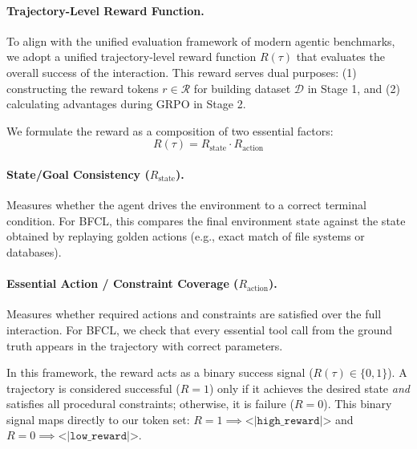 \documentclass{article}
\theoremstyle{plain}
\theoremstyle{definition}
\theoremstyle{remark}
\begin{document}
\paragraph{Trajectory-Level Reward Function.}
\label{sec:reward_function}
To align with the unified evaluation framework of modern agentic benchmarks, we adopt a unified trajectory-level reward function $R(\tau)$ that evaluates the overall success of the interaction. This reward serves dual purposes: (1) constructing the reward tokens $r \in \mathcal{R}$ for building dataset $\mathcal{D}$ in Stage 1, and (2) calculating advantages during GRPO in Stage 2.

We formulate the reward as a composition of two essential factors:
\begin{equation}
\label{eq:norm_reward}
    R(\tau) = R_{\text{state}} \cdot R_{\text{action}}
\end{equation}

\paragraph{State/Goal Consistency ($R_{\text{state}}$).}
Measures whether the agent drives the environment to a correct terminal condition. For BFCL, this compares the final environment state against the state obtained by replaying golden actions (e.g., exact match of file systems or databases).

\paragraph{Essential Action / Constraint Coverage ($R_{\text{action}}$).}
Measures whether required actions and constraints are satisfied over the full interaction. For BFCL, we check that every essential tool call from the ground truth appears in the trajectory with correct parameters.

In this framework, the reward acts as a binary success signal ($R(\tau) \in \{0, 1\}$). A trajectory is considered successful ($R=1$) only if it achieves the desired state \emph{and} satisfies all procedural constraints; otherwise, it is failure ($R=0$). This binary signal maps directly to our token set: $R=1 \implies \texttt{<|high\_reward|>}$ and $R=0 \implies \texttt{<|low\_reward|>}$.
\end{document}
